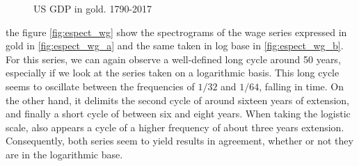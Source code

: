 \documentclass[a4paper,10cpi]{article}
\begin{document}
	\begin{figure}[H]
		\centering
		\caption{US GDP in gold. 1790-2017} \label{fig:espect_PBI}
	\end{figure}
	
	the figure \ref{fig:espect_wg} show the spectrograms of the wage series expressed in gold in \ref{fig:espect_wg_a} and the same taken in log base in \ref{fig:espect_wg_b}. For this series, we can again observe a well-defined long cycle around 50 years, especially if we look at the series taken on a logarithmic basis. This long cycle seems to oscillate between the frequencies of $1/32$ and $1/64$, falling in time. On the other hand, it delimits the second cycle of around sixteen years of extension, and finally a short cycle of between six and eight years. When taking the logistic scale, also appears a cycle of a higher frequency of about three years extension. Consequently, both series seem to yield results in agreement, whether or not they are in the logarithmic base.
	
\end{document}
